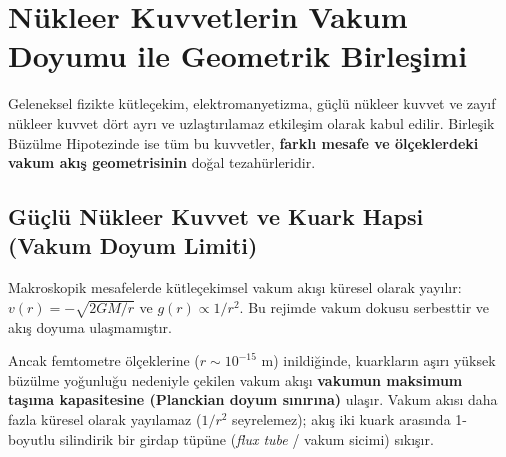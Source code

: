 \section{Nükleer Kuvvetlerin Vakum Doyumu ile Geometrik Birleşimi}
\label{sec:nukleer_kuvvetler}

Geleneksel fizikte kütleçekim, elektromanyetizma, güçlü nükleer kuvvet ve zayıf nükleer kuvvet dört ayrı ve uzlaştırılamaz etkileşim olarak kabul edilir. Birleşik Büzülme Hipotezinde ise tüm bu kuvvetler, \textbf{farklı mesafe ve ölçeklerdeki vakum akış geometrisinin} doğal tezahürleridir.

\subsection{Güçlü Nükleer Kuvvet ve Kuark Hapsi (Vakum Doyum Limiti)}
Makroskopik mesafelerde kütleçekimsel vakum akışı küresel olarak yayılır: $v(r) = -\sqrt{2GM/r}$ ve $g(r) \propto 1/r^2$. Bu rejimde vakum dokusu serbesttir ve akış doyuma ulaşmamıştır.

Ancak femtometre ölçeklerine ($r \sim 10^{-15}\text{ m}$) inildiğinde, kuarkların aşırı yüksek büzülme yoğunluğu nedeniyle çekilen vakum akışı \textbf{vakumun maksimum taşıma kapasitesine (Planckian doyum sınırına)} ulaşır. Vakum akısı daha fazla küresel olarak yayılamaz ($1/r^2$ seyrelemez); akış iki kuark arasında 1-boyutlu silindirik bir girdap tüpüne (\textit{flux tube} / vakum sicimi) sıkışır.

